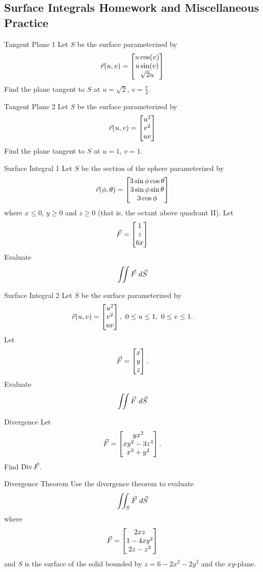 \renewcommand\thesubsection{\thesection.\Alph{subsection}}
\setcounter{subsection}{17}
\subsection{Surface Integrals Homework and Miscellaneous Practice}
\begin{exercise}{Tangent Plane 1}
Let $S$ be the surface parameterized by $$\vec{r}(u,v)=\begin{bmatrix}u\cos(v)\\u\sin(v)\\\sqrt{2}u\end{bmatrix}$$ Find the plane tangent to $S$ at $u=\sqrt{2}$, $v=\frac{\pi}{4}$.
\end{exercise}

\begin{exercise}{Tangent Plane 2}
Let $S$ be the surface parameterized by $$\vec{r}(u,v)=\begin{bmatrix}u^2\\v^2\\uv\end{bmatrix}$$ Find the plane tangent to $S$ at $u=1$, $v=1$.
\end{exercise}

\begin{pexercise}{Surface Integral 1}
Let $S$ be the section of the sphere parameterized by $$\vec{r}(\phi,\theta)=\begin{bmatrix}3\sin\phi\cos\theta \\ 3\sin\phi\sin\theta \\ 3\cos\phi\end{bmatrix}$$ where $x\leq 0$, $y\geq 0$ and $z\geq 0$ (that is, the octant above quadrant II). Let $$\vec{F}=\begin{bmatrix}1\\z\\6x\end{bmatrix}$$ Evaluate $$\iint \vec{F}\ d\vec{S} $$
\end{pexercise}

\begin{exercise}{Surface Integral 2}
Let $S$ be the surface parameterized by $$\vcr(u,v)=\bmat{u^2\\v^2\\uv},\ 0\leq u\leq1 ,\ 0\leq v \leq1 .  $$ Let $$\vec{F}=\begin{bmatrix}x\\y\\z\end{bmatrix}.$$ Evaluate $$\iint \vec{F} \ d\vec{S} $$
\end{exercise}

\begin{exercise}{Divergence}
Let $$\vec{F}=\begin{bmatrix}yx^2\\xy^2-3z^4\\x^3+y^2\end{bmatrix}. $$ Find $\operatorname{Div}\vec{F}$.
\end{exercise}

\begin{pexercise}{Divergence Theorem}
Use the divergence theorem to evaluate $$\iint_S \vec{F}\ d \vec{S} $$ where $$\vec{F}=\begin{bmatrix}2xz\\1-4xy^2\\2z-z^2\end{bmatrix} $$ and $S$ is the surface of the solid bounded by $z=6-2x^2-2y^2$ and the $xy$-plane.
\end{pexercise}


